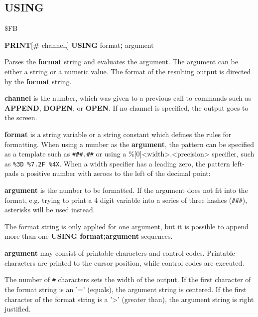 \subsection{USING}
\begin{description}[leftmargin=2cm,style=nextline]
\item [Token:]    \$FB

\item [Format:]   {\bf PRINT}[{\bf\#} channel{\bf,}] {\bf USING} format{\bf;} argument

\item [Usage:]    Parses the {\bf format} string and evaluates the argument. The argument can be either a string or a numeric value. The format of the resulting output is directed by the {\bf format} string.

                  {\bf channel} is the number, which was given to a previous call to commands such as {\bf APPEND}, {\bf DOPEN}, or {\bf OPEN}. If no channel is specified, the output goes to the screen.

                  {\bf format} is a string variable or a string constant which defines the rules for formatting. When using a number as the {\bf argument}, the pattern can be specified as a template such as \texttt{\#\#\#.\#\#} or using a \%[0]<width>.<precision> specifier, such as \texttt{\%3D \%7.2F \%4X}. When a width specifier has a leading zero, the pattern left-pads a positive number with zeroes to the left of the decimal point: 

                  {\bf argument} is the number to be formatted. If the argument does not fit into the format, e.g. trying to print a 4 digit variable into a series of three hashes (\texttt{\#\#\#}), asterisks will be used instead.

\item [Remarks:]  The format string is only applied for one argument, but it is possible to append more than one {\bf USING format;argument} sequences.

                  {\bf argument} may consist of printable characters and control codes. Printable characters are printed to the cursor position, while control codes are executed.
                
                  The number of \texttt{\#} characters sets the width of the output. If the first character of the format string is an '=' (equals), the argument string is centered. If the first character of the format string is a '>' (greater than), the argument string is right justified.


\end{description}
